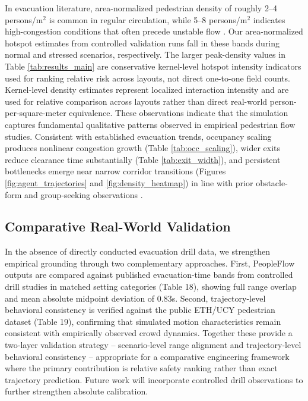 \documentclass[nolineno]{ieeeaccess}
\begin{document}
In evacuation literature, area-normalized pedestrian density of roughly 2--4 persons/m$^2$ is common in regular circulation, while 5--8 persons/m$^2$ indicates high-congestion conditions that often precede unstable flow \cite{fruin,crowd_book,haghani2020}. Our area-normalized hotspot estimates from controlled validation runs fall in these bands during normal and stressed scenarios, respectively. The larger peak-density values in Table \ref{tab:results_main} are conservative kernel-level hotspot intensity indicators used for ranking relative risk across layouts, not direct one-to-one field counts. Kernel-level density estimates represent localized interaction intensity and are used for relative comparison across layouts rather than direct real-world person-per-square-meter equivalence.
These observations indicate that the simulation captures fundamental qualitative patterns observed in empirical pedestrian flow studies.
Consistent with established evacuation trends, occupancy scaling produces nonlinear congestion growth (Table \ref{tab:occ_scaling}), wider exits reduce clearance time substantially (Table \ref{tab:exit_width}), and persistent bottlenecks emerge near narrow corridor transitions (Figures \ref{fig:agent_trajectories} and \ref{fig:density_heatmap}) in line with prior obstacle-form and group-seeking observations \cite{yano2018obstacle,chen2021entropy}.

\subsection{Comparative Real-World Validation}
In the absence of directly conducted evacuation drill data, we strengthen empirical grounding through two complementary approaches. First, PeopleFlow outputs are compared against published evacuation-time bands from controlled drill studies in matched setting categories (Table 18), showing full range overlap and mean absolute midpoint deviation of 0.83s. Second, trajectory-level behavioral consistency is verified against the public ETH/UCY pedestrian dataset (Table 19), confirming that simulated motion characteristics remain consistent with empirically observed crowd dynamics. Together these provide a two-layer validation strategy -- scenario-level range alignment and trajectory-level behavioral consistency -- appropriate for a comparative engineering framework where the primary contribution is relative safety ranking rather than exact trajectory prediction. Future work will incorporate controlled drill observations to further strengthen absolute calibration.
\end{document}
